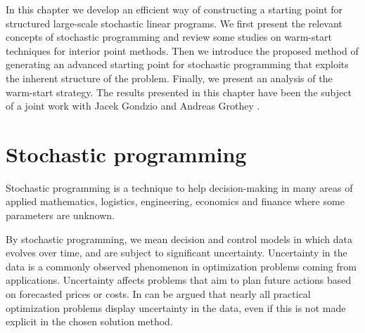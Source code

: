 
%
%
\label{ch:Warmstart}

In this chapter we develop an efficient way of constructing a 
starting point for structured large-scale stochastic linear programs.
We first present the relevant
concepts of stochastic programming and review some studies on 
warm-start techniques for interior point methods. Then we introduce 
the proposed method of generating an advanced starting point for 
stochastic programming that exploits the inherent structure of the
problem. Finally, we present an analysis of the warm-start strategy.
The results presented in this chapter have been the subject
of a joint work with Jacek Gondzio and Andreas Grothey
\cite{ColomboGondzioGrothey06}. 


%
%
\section{Stochastic programming}

Stochastic programming \cite{BirgeLouveaux,KallWallace}
is a technique to help decision-making 
in many areas of applied mathematics, logistics, engineering, economics and 
finance where some parameters are unknown.


By stochastic programming, we mean decision and control models in which 
data evolves over time, and are subject to significant uncertainty.
%
Uncertainty in the data is a commonly observed phenomenon in
optimization problems coming from applications. Uncertainty
affects problems that aim to plan future actions based on forecasted
prices or costs. In can be argued that nearly all practical
optimization problems display uncertainty in the data, even if this is
not made explicit in the chosen solution method. 

